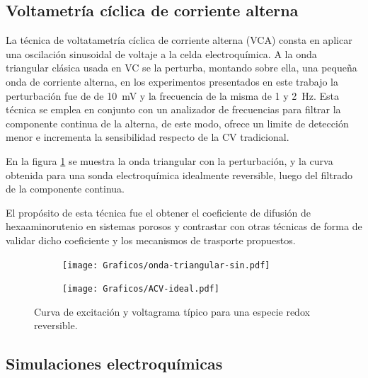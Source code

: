 	 		

	 \subsection{Voltametría cíclica de corriente alterna}

	 		La técnica de voltatametría cíclica de corriente alterna (VCA) consta en aplicar una oscilación sinusoidal de voltaje a la celda electroquímica. A la onda triangular clásica usada en VC se la perturba, montando sobre ella, una pequeña onda de corriente alterna, en los experimentos presentados en este trabajo la perturbación fue de de \SI{10}{\milli\volt} y la frecuencia de la misma de 1 y \SI{2}{\hertz}. Esta técnica se emplea en conjunto con un analizador de frecuencias para filtrar la componente continua de la alterna, de este modo, ofrece un limite de detección menor e incrementa la sensibilidad respecto de la CV tradicional.\cite{Wi2000,Skoog1995}

	 		En la figura \ref{fig:ACV_ideal} se muestra la onda triangular con la perturbación, y la curva obtenida para una sonda electroquímica idealmente reversible, luego del filtrado de la componente continua.

	 		El propósito de esta técnica fue el obtener el coeficiente de difusión de hexaaminorutenio en sistemas porosos y contrastar con otras técnicas de forma de validar dicho coeficiente y los mecanismos de trasporte propuestos. 

	 			 \begin{figure}[hb!]
			  		  \begin{subfigure}[t]{0.495\textwidth}
			  		  \texttt{[image: Graficos/onda-triangular-sin.pdf]}
			  		  \end{subfigure}
			  		  \begin{subfigure}[t]{0.495\textwidth}
			  		  \texttt{[image: Graficos/ACV-ideal.pdf]}
			  		  \end{subfigure}
			  		  \caption[Voltamperometria ideal reversible]{Curva de excitación y voltagrama típico para una especie redox reversible.}
			  		  \label{fig:ACV_ideal}
			  		  \end{figure}
	 		
	 		
			
	 \subsection{Simulaciones electroquímicas}\label{simulacion}

